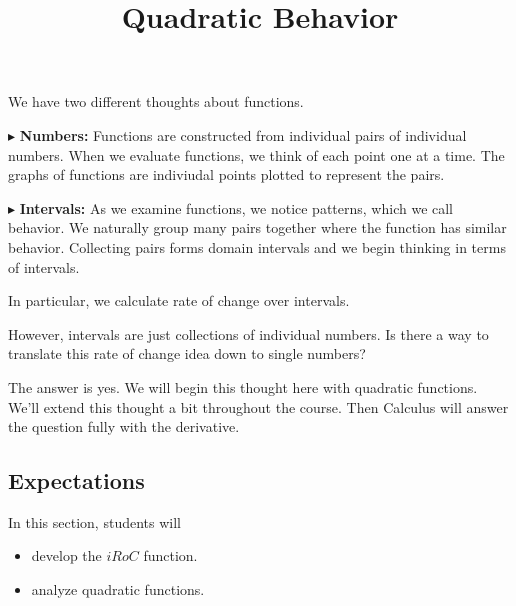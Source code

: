 \documentclass{ximera}
\title{Quadratic Behavior}
\begin{document}
\begin{abstract}
\end{abstract}
\maketitle







We have two different thoughts about functions.


$\blacktriangleright$ \textbf{Numbers:}  Functions are constructed from individual pairs of individual numbers.  When we evaluate functions, we think of each point one at a time.  The graphs of functions are indiviudal points plotted to represent the pairs. 







$\blacktriangleright$ \textbf{Intervals:} As we examine functions, we notice patterns, which we call behavior. We naturally group many pairs together where the function has similar behavior.  Collecting pairs forms domain intervals and we begin thinking in terms of intervals.





In particular, we calculate rate of change over intervals. 


However, intervals are just collections of individual numbers.  Is there a way to translate this rate of change idea down to single numbers?

The answer is yes.  We will begin this thought here with quadratic functions. We'll extend this thought a bit throughout the course. Then Calculus will answer the question fully with the derivative.













\subsection{Expectations}

\begin{sectionOutcomes}
In this section, students will 

\begin{itemize}
\item develop the $iRoC$ function.
\item analyze quadratic functions.
\end{itemize}
\end{sectionOutcomes}
\end{document}
